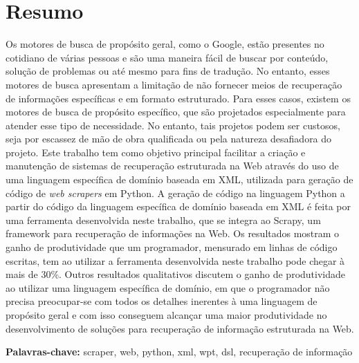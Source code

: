 \cleardoublepage
{}
\chapter*{Resumo}
\thispagestyle{fancy}
Os motores de busca de propósito geral, como o Google, estão presentes no cotidiano de várias pessoas e são uma maneira fácil de buscar por conteúdo, solução de problemas ou até mesmo para fins de tradução. No entanto, esses motores de busca apresentam a limitação de não fornecer meios de recuperação de informações específicas e em formato estruturado. Para esses casos, existem os motores de busca de propósito específico, que são projetados especialmente para atender esse tipo de necessidade. No entanto, tais projetos podem ser custosos, seja por escassez de mão de obra qualificada ou pela natureza desafiadora do projeto. Este trabalho tem como objetivo principal facilitar a criação e manutenção de sistemas de recuperação estruturada na Web através do uso de uma linguagem específica de domínio baseada em XML, utilizada para geração de código de \emph{web scrapers} em Python. A geração de código na linguagem Python a partir do código da linguagem específica de domínio baseada em XML é feita por uma ferramenta desenvolvida neste trabalho, que se integra ao Scrapy, um framework para recuperação de informações na Web. Os resultados mostram o ganho de produtividade que um programador, mensurado em linhas de código escritas, tem ao utilizar a ferramenta desenvolvida neste trabalho pode chegar à mais de 30\%. Outros resultados qualitativos discutem o ganho de produtividade ao utilizar uma linguagem específica de domínio, em que o programador não precisa preocupar-se com todos os detalhes inerentes à uma linguagem de propósito geral e com isso conseguem alcançar uma maior produtividade no desenvolvimento de soluções para recuperação de informação estruturada na Web.
	
	\textbf{Palavras-chave:} scraper, web, python, xml, wpt, dsl, recuperação de informação

\cleardoublepage
{}
